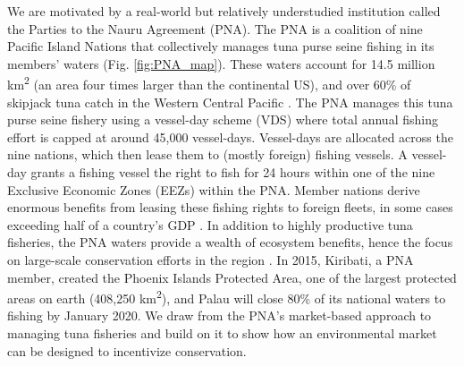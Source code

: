 \documentclass[12pt]{article}
\begin{document}
We are motivated by a real-world but relatively understudied institution called the Parties to the Nauru Agreement (PNA). The PNA is a coalition of nine Pacific Island Nations that collectively manages tuna purse seine fishing in its members' waters \cite{havice_2013,aqorau_2018} (Fig. \ref{fig:PNA_map}). These waters account for 14.5 million km\textsuperscript{2} (an area four times larger than the continental US), and over 60\% of skipjack tuna catch in the Western Central Pacific \cite{havice_2013}. The PNA manages this tuna purse seine fishery using a vessel-day scheme (VDS) where total annual fishing effort is capped at around 45,000 vessel-days. Vessel-days are allocated across the nine nations, which then lease them to (mostly foreign) fishing vessels. A vessel-day grants a fishing vessel the right to fish for 24 hours within one of the nine Exclusive Economic Zones (EEZs) within the PNA. Member nations derive enormous benefits from leasing these fishing rights to foreign fleets, in some cases exceeding half of a country's GDP \cite{ffa_2017b}. In addition to highly productive tuna fisheries, the PNA waters provide a wealth of ecosystem benefits, hence the focus on large-scale conservation efforts in the region \cite{mcleod_2019}. In 2015, Kiribati, a PNA member, created the Phoenix Islands Protected Area, one of the largest protected areas on earth (408,250 km\textsuperscript{2}), and Palau will close 80\% of its national waters to fishing by January 2020. We draw from the PNA's market-based approach to managing tuna fisheries and build on it to show how an environmental market can be designed to incentivize conservation.
\end{document}
